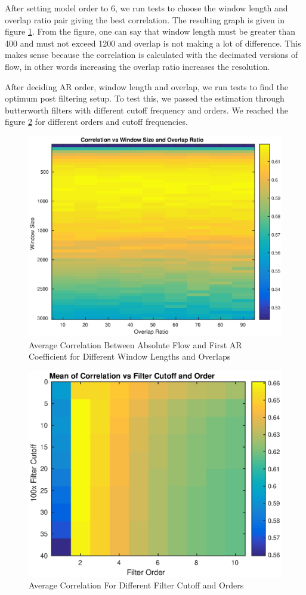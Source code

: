 \documentclass[a4paper,onesided,12pt]{report}
\begin{document}
After setting model order to 6, we run tests to choose the window length and overlap ratio pair giving the best correlation. The resulting graph is given in figure \ref{winArWinLenOverlap}. From the figure, one can say that window length must be greater than 400 and must not exceed 1200 and overlap is not making a lot of difference. This makes sense because the correlation is calculated with the decimated versions of flow, in other words increasing the overlap ratio increases the resolution.  

After deciding AR order, window length and overlap, we run tests to find the optimum post filtering setup. To test this, we passed the estimation through butterworth filters with different cutoff frequency and orders. We reached the figure \ref{winArCutoffOrder} for different orders and cutoff frequencies.
\begin{figure}[H]
	\centering
	\includegraphics[width=0.8\linewidth]{windowAr_WinLenOverlap.eps}
	\caption{Average Correlation Between Absolute Flow and First AR Coefficient for Different Window Lengths and Overlaps}
	\label{winArWinLenOverlap}
\end{figure}

 

\begin{figure}[H]
	\centering
	\includegraphics[width=0.8\linewidth]{windowedArCutoffOrder.eps}
	\caption{Average Correlation For Different Filter Cutoff and Orders}
	\label{winArCutoffOrder}
\end{figure}
\end{document}

